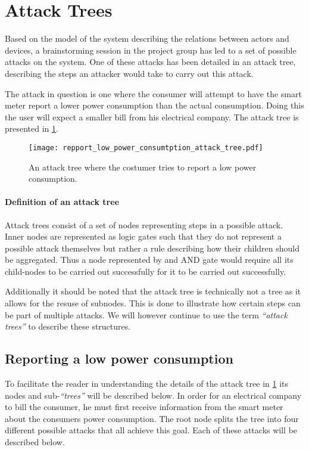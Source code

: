 \section{Attack Trees}
Based on the model of the system describing the relations between actors and devices, a brainstorming session in the project group has led to a set of possible attacks on the system.
One of these attacks has been detailed in an attack tree, describing the steps an attacker would take to carry out this attack.

The attack in question is one where the consumer will attempt to have the smart meter report a lower power consumption than the actual consumption.
Doing this the user will expect a smaller bill from his electrical company.
The attack tree is presented in \cref{report_power_attack_tree}.

\begin{figure}
  \texttt{[image: repport\_low\_power\_consumtption\_attack\_tree.pdf]}
  \caption{An attack tree where the costumer tries to report a low power consumption.}
  \label{report_power_attack_tree}
\end{figure}

\paragraph{Definition of an attack tree}
Attack trees consist of a set of nodes representing steps in a possible attack.
Inner nodes are represented as logic gates such that they do not represent a possible attack themselves but rather a rule describing how their children should be aggregated.
Thus a node represented by and AND gate would require all its child-nodes to be carried out successfully for it to be carried out successfully.

Additionally it should be noted that the attack tree is technically not a tree as it allows for the resuse of subnodes.
This is done to illustrate how certain steps can be part of multiple attacks.
We will however continue to use the term \emph{``attack trees''} to describe these structures.

\subsection{Reporting a low power consumption}
To facilitate the reader in understanding the details of the attack tree in \cref{report_power_attack_tree} its nodes and sub-\emph{``trees''} will be described below.
In order for an electrical company to bill the consumer, he must first receive information from the smart meter about the consumers power consumption.
The root node splits the tree into four different possible attacks that all achieve this goal.
Each of these attacks will be described below.

